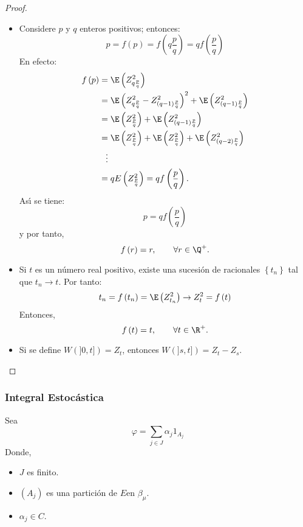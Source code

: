 \begin{ejemplo}
\begin{proof}
\begin{itemize}
\item Considere $p$ y $q$ enteros positivos; entonces:
\[
p=f\left( p \right)=f\left( q\frac{p}{q} \right)=qf\left( \frac{p}{q} 
\right)
\]
En efecto:
\begin{align*}
 f\left( p \right)
	&=\E\left( Z_{q\frac{p}{q}}^{2} \right)\\
	&=\E\left(Z_{q\frac{p}{q}}^{2}-Z_{\left( q-1 \right)\frac{p}{q}}^{2} \right)^{2}+\E\left( Z_{\left( q-1 \right)\frac{p}{q}}^{2} \right)\\
	&=\E\left(Z_{\frac{p}{q}}^{2} \right)+\E\left( Z_{\left( q-1 \right)\frac{p}{q}}^{2}\right)\\
	&=\E\left( Z_{\frac{p}{q}}^{2} \right)+\E\left( Z_{\frac{p}{q}}^{2}\right)+\E\left( Z_{\left( q-2 \right)\frac{p}{q}}^{2} \right)\\
	&\phantom{=}\vdots\\
	&=qE\left( Z_{\frac{p}{q}}^{2} \right)=qf\left( \frac{p}{q}\right).
\end{align*}
As\'{\i} se tiene:
\[
p=qf\left( \frac{p}{q} \right)
\]
y por tanto,
\[
f\left( r \right)=r, \qquad \forall r\in \Q^{+}.
\]
\item Si $t$ es un n\'{u}mero real positivo, existe una sucesi\'{o}n de racionales $\left\{ t_{n} \right\}$ tal que $t_{n}\to t$. Por tanto:
\[
t_{n}=f\left( t_{n} \right)=\E\left( Z_{t_{n}}^{2} \right)\to 
Z_{t}^{2}=f\left( t \right)
\]
Entonces,
\[
f\left( t \right)=t,\qquad \forall t\in \R^{+}.
\]

\item Si se define $W(]0,t])=Z_{t}$, entonces $W(]s,t])=Z_{t}-Z_{s}$.
\end{itemize}
\end{proof}
\end{ejemplo}

\subsubsection{Integral Estoc\'{a}stica}
Sea 
\[
\varphi =\sum_{j\in J} {\alpha_{j}1_{A_{j}}} 
\]
Donde,
\begin{itemize}
 \item $J$ es finito.
 \item $\left( A_{j} \right)$ es una partici\'{o}n de $E $en $\beta_{\mu }$.
 \item $\alpha_{j}\in C$.
\end{itemize}

